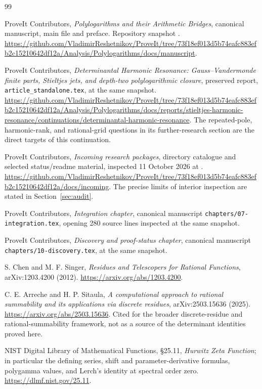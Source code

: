 \begin{thebibliography}{99}

ProveIt Contributors,
\emph{Polylogarithms and their Arithmetic Bridges}, canonical manuscript,
main file and preface. Repository snapshot \pin.
\url{https://github.com/VladimirReshetnikov/ProveIt/tree/73f18ef013d5b74eafc883efb2c15210642df12a/Analysis/Polylogarithms/docs/manuscript}.

ProveIt Contributors,
\emph{Determinantal Harmonic Resonance: Gauss--Vandermonde finite parts,
Stieltjes jets, and depth-two polylogarithmic closure}, preserved report,
\texttt{article\_standalone.tex}, at the same snapshot.
\url{https://github.com/VladimirReshetnikov/ProveIt/tree/73f18ef013d5b74eafc883efb2c15210642df12a/Analysis/Polylogarithms/docs/reports/stieltjes-harmonic-resonance/continuations/determinantal-harmonic-resonance}.
The repeated-pole, harmonic-rank, and rational-grid questions in its
further-research section are the direct targets of this continuation.

ProveIt Contributors,
\emph{Incoming research packages}, directory catalogue and selected
status/readme material, inspected 11 October 2026 at \pin.
\url{https://github.com/VladimirReshetnikov/ProveIt/tree/73f18ef013d5b74eafc883efb2c15210642df12a/docs/incoming}.
The precise limits of interior inspection are stated in Section~\ref{sec:audit}.

ProveIt Contributors,
\emph{Integration chapter},
canonical manuscript \texttt{chapters/07-integration.tex}, opening 280
source lines inspected at the same snapshot.

ProveIt Contributors,
\emph{Discovery and proof-status chapter}, canonical manuscript
\texttt{chapters/10-discovery.tex}, at the same snapshot.

S. Chen and M. F. Singer,
\emph{Residues and Telescopers for Rational Functions},
arXiv:1203.4200 (2012).
\url{https://arxiv.org/abs/1203.4200}.

C. E. Arreche and H. P. Sitaula,
\emph{A computational approach to rational summability and its applications
via discrete residues}, arXiv:2503.15636 (2025).
\url{https://arxiv.org/abs/2503.15636}.
Cited for the broader discrete-residue and rational-summability framework,
not as a source of the determinant identities proved here.

NIST Digital Library of Mathematical Functions,
\S25.11, \emph{Hurwitz Zeta Function}; in particular the defining series,
shift and parameter-derivative formulas, polygamma values, and Lerch's
identity at spectral order zero.
\url{https://dlmf.nist.gov/25.11}.


\end{thebibliography}
